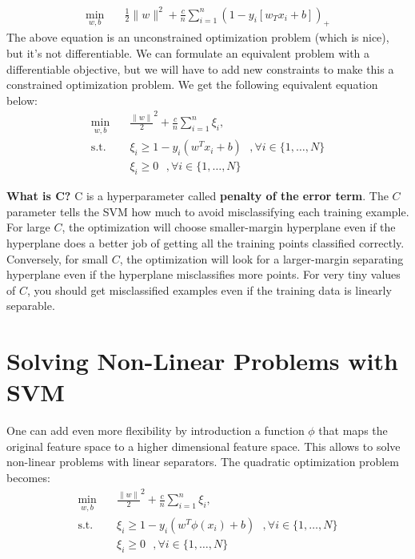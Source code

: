 \documentclass[12pt]{article}
\begin{document}
\begin{enumerate}
  \begin{equation}
    \begin{aligned}
    \min_{w,b} \quad & \frac{1}{2} \lVert w \rVert^{2} + \frac{c}{n} \sum_{i=1}^{n} (1-y_{i}[w_{T}x_{i}+b])_{+}
    \end{aligned}
    \end{equation}
The above equation is an unconstrained optimization problem (which is nice), but it's not differentiable. We can formulate an equivalent problem with a differentiable objective, but we will have to add new constraints to make this a constrained optimization problem. We get the following equivalent equation below:
  \begin{equation}
    \begin{aligned}
    \min_{w,b} \quad & \frac{\lVert w \rVert}{2}^{2} + \frac{c}{n} \sum_{i=1}^{n} \xi_{i},\\
    \textrm{s.t.} \quad & \xi_{i} \geq 1 - y_{i}(w^{T}x_{i}+b)  \text{  },\forall i \in \{1,\dots,N\} \\
    & \xi_{i} \geq 0 \text{  },\forall i \in \{1,\dots,N\}
    \end{aligned}
    \end{equation}
\end{enumerate}
\textbf{What is C?} C is a hyperparameter called \textbf{penalty of the error term}. The $C$ parameter tells the SVM how much to avoid misclassifying each training example. For large $C$, the optimization will choose smaller-margin hyperplane even if the hyperplane does a better job of getting all the training points classified correctly. Conversely, for small $C$, the optimization will look for a larger-margin separating hyperplane even if the hyperplane misclassifies more points. For very tiny values of $C$, you should get misclassified examples even if the training data is linearly separable.

\section{Solving Non-Linear Problems with SVM}
One can add even more flexibility by introduction a function $\phi$ that maps the original feature space to a higher dimensional feature space. This allows to solve non-linear problems with linear separators. The quadratic optimization problem becomes:
\begin{equation}
    \begin{aligned}
    \min_{w,b} \quad & \frac{\lVert w \rVert}{2}^{2} + \frac{c}{n} \sum_{i=1}^{n} \xi_{i},\\
    \textrm{s.t.} \quad & \xi_{i} \geq 1 - y_{i}(w^{T}\phi(x_{i})+b)  \text{  },\forall i \in \{1,\dots,N\} \\
    & \xi_{i} \geq 0 \text{  },\forall i \in \{1,\dots,N\}
    \end{aligned}
    \end{equation}
\end{document}
